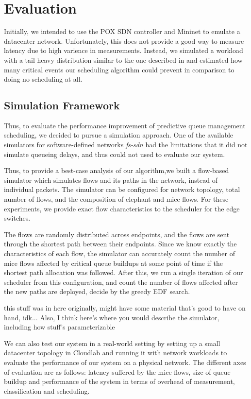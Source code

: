 \section{Evaluation}
Initially, we intended to use the POX SDN controller and Mininet to emulate a
datacenter network. Unfortunately, this does not provide a good way to measure
latency due to high varience in measurements. Instead, we simulated a workload
with a tail heavy distribution similar to the one described in
\cite{dctcp} and estimated how many critical events our scheduling algorithm
could prevent in comparison to doing no scheduling at all.

\subsection{Simulation Framework}
Thus, to evaluate the performance improvement of predictive
queue management scheduling, we decided to pursue a simulation
approach. One of the available simulators for software-defined networks
\emph{fs-sdn} \cite{fssdn} had the limitations that it did not simulate
queueing delays, and thus could not used to evaluate our system. 

Thus, to provide a best-case analysis of our algorithm,we built a 
flow-based simulator which simulates flows and its paths in the network,
instead of individual packets. The simulator can be configured for network topology,
total number of flows, and the composition of elephant and mice flows. For these
experiments, we provide exact  flow characteristics to the scheduler for the edge
switches. 

The flows are randomly distributed across endpoints, and the flows
are sent through the shortest path between their endpoints. Since we know
exactly the characteristics of each flow, the simulator can accurately count the
number of mice flows affected by critical queue buildups at some point of time
if the shortest path allocation was followed. After this, we run a single iteration
of our scheduler from this configuration, and count the number of flows 
affected after the new paths are deployed, decide by the greedy EDF search. 


\iffalse this stuff was in here originally, might have some material that's
good to have on hand, idk... Also, I think here's where you would describe the
simulator, including how stuff's parameterizable

We can also test our system in a real-world setting by setting up a small datacenter topology in Cloudlab and running it with network workloads to evaluate the performance of our system on a physical network.  The different axes of evaluation are as follows: latency suffered by the mice flows, size of queue buildup and performance of the system in terms of overhead of measurement, classification and scheduling. 

